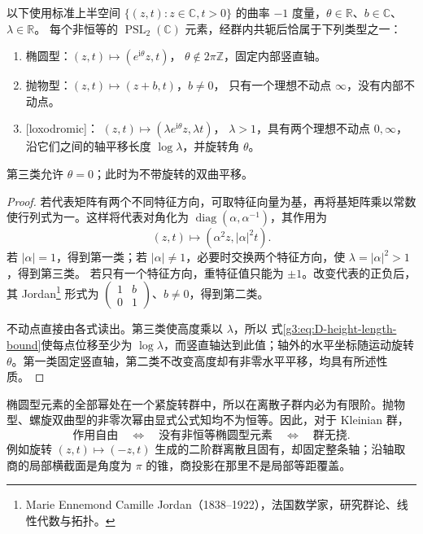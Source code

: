 \begin{proposition}\label{g3:prop:D-kleinian-element-types}
	以下使用标准上半空间 \(\{(z,t):z\in\mathbb C,t>0\}\) 的曲率 \(-1\) 度量，\(\theta\in\mathbb R\)、\(b\in\mathbb C\)、\(\lambda\in\mathbb R\)。
	每个非恒等的 \(\operatorname{PSL}_2(\mathbb C)\) 元素，经群内共轭后恰属于下列类型之一：
	\begin{enumerate}
		\item 椭圆型：\((z,t)\mapsto(e^{\mathrm i\theta}z,t)\)，
		      \(\theta\notin2\pi\mathbb Z\)，固定内部竖直轴。
		\item 抛物型：\((z,t)\mapsto(z+b,t)\)，\(b\ne0\)，
		      只有一个理想不动点 \(\infty\)，没有内部不动点。
		\item {}[loxodromic]：
		      \((z,t)\mapsto(\lambda e^{\mathrm i\theta}z,\lambda t)\)，
		      \(\lambda>1\)，具有两个理想不动点 \(0,\infty\)，
		      沿它们之间的轴平移长度 \(\log\lambda\)，并旋转角 \(\theta\)。
	\end{enumerate}
	第三类允许 \(\theta=0\)；此时为不带旋转的双曲平移。
\end{proposition}
\begin{proof}
	若代表矩阵有两个不同特征方向，可取特征向量为基，再将基矩阵乘以常数使行列式为一。这样将代表对角化为
	\(\operatorname{diag}(\alpha,\alpha^{-1})\)，其作用为
	\[
		(z,t)\longmapsto(\alpha^2z,|\alpha|^2t).
	\]
	若 \(|\alpha|=1\)，得到第一类；若 \(|\alpha|\ne1\)，必要时交换两个特征方向，使 \(\lambda=|\alpha|^2>1\)，得到第三类。
	若只有一个特征方向，重特征值只能为 \(\pm1\)。改变代表的正负后，其 Jordan\footnote{Marie Ennemond Camille Jordan（1838--1922），法国数学家，研究群论、线性代数与拓扑。} 形式为
	\(\begin{pmatrix}1&b\\0&1\end{pmatrix}\)、\(b\ne0\)，得到第二类。

	不动点直接由各式读出。第三类使高度乘以 \(\lambda\)，所以
	式\eqref{g3:eq:D-height-length-bound}使每点位移至少为
	\(\log\lambda\)，而竖直轴达到此值；轴外的水平坐标随运动旋转
	\(\theta\)。第一类固定竖直轴，第二类不改变高度却有非零水平平移，均具有所述性质。
\end{proof}

椭圆型元素的全部幂处在一个紧旋转群中，所以在离散子群内必为有限阶。抛物型、螺旋双曲型的非零次幂由显式公式知均不为恒等。因此，对于 Kleinian 群，
\[
	\text{作用自由}
	\quad\Longleftrightarrow\quad
	\text{没有非恒等椭圆型元素}
	\quad\Longleftrightarrow\quad
	\text{群无挠}.
\]
例如旋转 \((z,t)\mapsto(-z,t)\) 生成的二阶群离散且固有，却固定整条轴；沿轴取商的局部横截面是角度为 \(\pi\) 的锥，商投影在那里不是局部等距覆盖。

